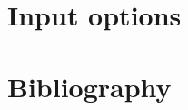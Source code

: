 \documentclass[11pt]{article}
\newcounter{command}
\begin{document}
 \renewcommand{\cftoptionSummarysetupfont}{\bf}
 \renewcommand{\cftoptionSummarysetupaftersnum}{}
 \renewcommand{\cftoptionSummarysetupaftersnumb}{}
 \renewcommand{\cftoptionSummarysetupleader}{\cftdotfill{\cftoptionSummarysetupdotsep}}
 \renewcommand{\cftoptionSummarysetupdotsep}{\cftdotsep}
 \renewcommand{\cftoptionSummarysetuppagefont}{}
 \renewcommand{\cftoptionSummarysetupafterpnum}{}
 \renewcommand{\cftoptionSummarysetuppresnum}{SOMETHING }

\renewcommand{\cftsetupoptstitlefont}{\Large\bf}
\renewcommand{\cftdynamicsoptstitlefont}{\Large\bf}
\renewcommand{\cftrxnoptstitlefont}{\Large\bf}
\renewcommand{\cftmiscoptstitlefont}{\Large\bf}

\section{Input options}


\begin{multicols}{2}
\listofoptionSummarysetup
\end{multicols}

\begin{multicols}{2}
\listofoptionSummarydynamics
\end{multicols}


\begin{multicols}{2}
\listofoptionSummaryrxn
\end{multicols}

\begin{multicols}{2}
\listofoptionSummarymisc
\end{multicols}




\section{Bibliography}

\end{document}
